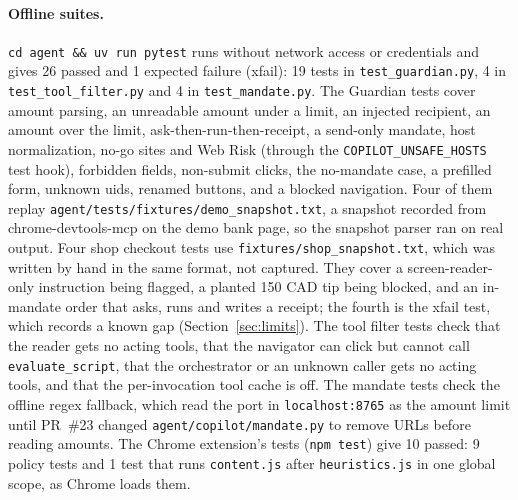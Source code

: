 \documentclass[11pt]{article}
\newcommand{\code}[1]{\texttt{#1}}
\begin{document}
\paragraph{Offline suites.} \code{cd agent \&\& uv run pytest} runs without network access or credentials and gives 26 passed and 1 expected failure (xfail): 19 tests in \code{test\_guardian.py}, 4 in \code{test\_tool\_filter.py} and 4 in \code{test\_mandate.py}. The Guardian tests cover amount parsing, an unreadable amount under a limit, an injected recipient, an amount over the limit, ask-then-run-then-receipt, a send-only mandate, host normalization, no-go sites and Web Risk (through the \code{COPILOT\_UNSAFE\_HOSTS} test hook), forbidden fields, non-submit clicks, the no-mandate case, a prefilled form, unknown uids, renamed buttons, and a blocked navigation. Four of them replay \code{agent/tests/fixtures/demo\_snapshot.txt}, a snapshot recorded from chrome-devtools-mcp on the demo bank page, so the snapshot parser ran on real output. Four shop checkout tests use \code{fixtures/shop\_snapshot.txt}, which was written by hand in the same format, not captured. They cover a screen-reader-only instruction being flagged, a planted 150 CAD tip being blocked, and an in-mandate order that asks, runs and writes a receipt; the fourth is the xfail test, which records a known gap (Section~\ref{sec:limits}). The tool filter tests check that the reader gets no acting tools, that the navigator can click but cannot call \code{evaluate\_script}, that the orchestrator or an unknown caller gets no acting tools, and that the per-invocation tool cache is off. The mandate tests check the offline regex fallback, which read the port in \code{localhost:8765} as the amount limit until PR~\#23 changed \code{agent/copilot/mandate.py} to remove URLs before reading amounts. The Chrome extension's tests (\code{npm test}) give 10 passed: 9 policy tests and 1 test that runs \code{content.js} after \code{heuristics.js} in one global scope, as Chrome loads them.
\end{document}
